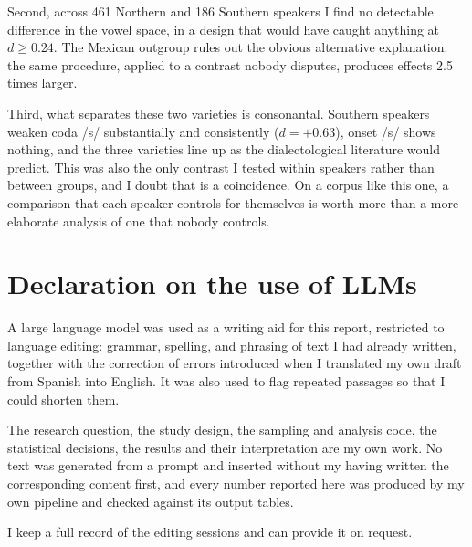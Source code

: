 \documentclass[11pt]{article}
\begin{document}
Second, across 461 Northern and 186 Southern speakers I find no detectable
difference in the vowel space, in a design that would have caught anything at
$d \geq 0.24$. The Mexican outgroup rules out the obvious alternative
explanation: the same procedure, applied to a contrast nobody disputes, produces
effects 2.5 times larger.

Third, what separates these two varieties is consonantal. Southern speakers
weaken coda /s/ substantially and consistently ($d = +0.63$), onset /s/ shows
nothing, and the three varieties line up as the dialectological literature would
predict. This was also the only contrast I tested within speakers rather than
between groups, and I doubt that is a coincidence. On a corpus like this one, a
comparison that each speaker controls for themselves is worth more than a more
elaborate analysis of one that nobody controls.

\section*{Declaration on the use of LLMs}

A large language model was used as a writing aid for this report, restricted to
language editing: grammar, spelling, and phrasing of text I had already written,
together with the correction of errors introduced when I translated my own draft
from Spanish into English. It was also used to flag repeated passages so that I
could shorten them.

The research question, the study design, the sampling and analysis code, the
statistical decisions, the results and their interpretation are my own work. No
text was generated from a prompt and inserted without my having written the
corresponding content first, and every number reported here was produced by my
own pipeline and checked against its output tables.

I keep a full record of the editing sessions and can provide it on request.



\end{document}
